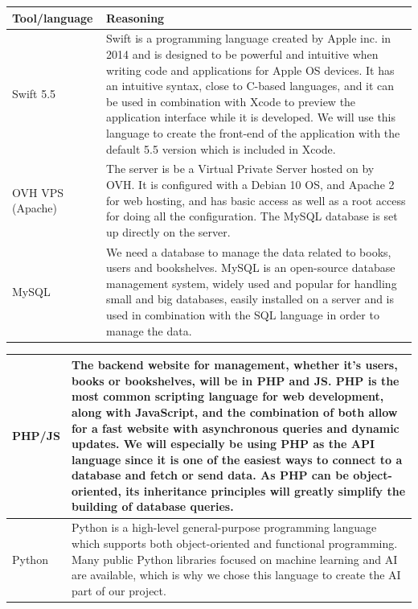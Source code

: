 \documentclass[conference]{IEEEtran}
\begin{document}
\begin{center}
\begin{tabular}{ | m{1.9cm} | m{5.7cm}| } 

\hline
Tool/language & Reasoning \\
 \hline
 Swift 5.5 &  Swift is a programming language created by Apple inc. in 2014 and is designed to be powerful and intuitive when writing code and applications for Apple OS devices. It has an intuitive syntax, close to C-based languages, and it can be used in combination with Xcode to preview the application interface while it is developed. We will use this language to create the front-end of the application with the default 5.5 version which is included in Xcode.\\
  \hline
 OVH VPS (Apache) &  The server is be a Virtual Private Server hosted on by OVH. It is configured with a Debian 10 OS, and Apache 2 for web hosting, and has basic access as well as a root access for doing all the configuration. The MySQL database is set up directly on the server.\\ 
 \hline
 MySQL & We need a database to manage the data related to books, users and bookshelves. MySQL is an open-source database management system, widely used and popular for handling small and big databases, easily installed on a server and is used in combination with the SQL language in order to manage the data.\\
 \hline
 \end{tabular}
 
 \begin{tabular}{ | m{1.9cm} | m{5.7cm}| } 
 \hline
 PHP/JS & The backend website for management, whether it's users, books or bookshelves, will be in PHP and JS. PHP is the most common scripting language for web development, along with JavaScript, and the combination of both allow for a fast website with asynchronous queries and dynamic updates. We will especially be using PHP as the API language since it is one of the easiest ways to connect to a database and fetch or send data. As PHP can be object-oriented, its inheritance principles will greatly simplify the building of database queries.\\
 \hline
 Python & Python is a high-level general-purpose programming language which supports both object-oriented and functional programming. Many public Python libraries focused on machine learning and AI are available, which is why we chose this language to create the AI part of our project. \\
 \hline
 
\end{tabular}
\end{center}
\hfill
\end{document}
